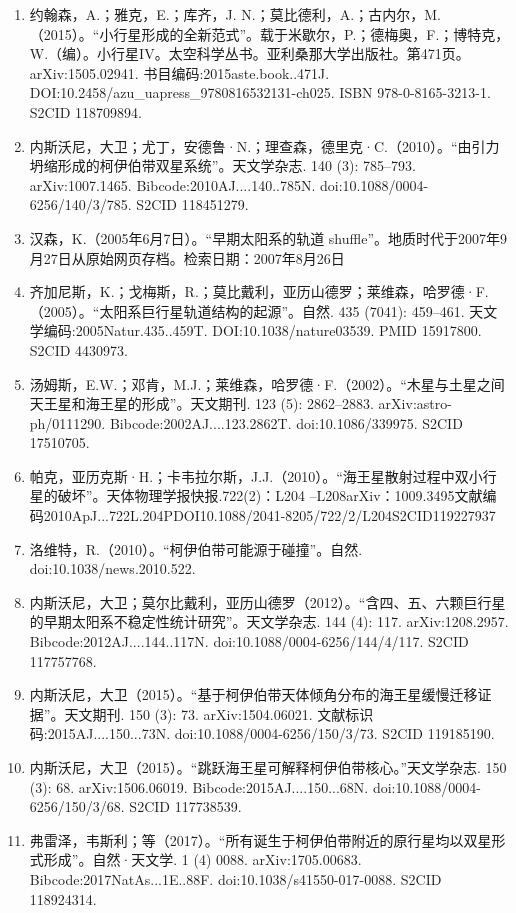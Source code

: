 \begin{enumerate}
\item 约翰森，A.；雅克，E.；库齐，J. N.；莫比德利，A.；古内尔，M.（2015）。“小行星形成的全新范式”。载于米歇尔，P.；德梅奥，F.；博特克，W.（编）。小行星IV。太空科学丛书。亚利桑那大学出版社。第471页。arXiv:1505.02941. 书目编码:2015aste.book..471J. DOI:10.2458/azu_uapress_9780816532131-ch025. ISBN 978-0-8165-3213-1. S2CID 118709894.
\item 内斯沃尼，大卫；尤丁，安德鲁·N.；理查森，德里克·C.（2010）。“由引力坍缩形成的柯伊伯带双星系统”。天文学杂志. 140 (3): 785–793. arXiv:1007.1465. Bibcode:2010AJ....140..785N. doi:10.1088/0004-6256/140/3/785. S2CID 118451279.
\item 汉森，K.（2005年6月7日）。“早期太阳系的轨道 shuffle”。地质时代于2007年9月27日从原始网页存档。检索日期：2007年8月26日
\item 齐加尼斯，K.；戈梅斯，R.；莫比戴利，亚历山德罗；莱维森，哈罗德·F.（2005）。“太阳系巨行星轨道结构的起源”。自然. 435 (7041): 459–461. 天文学编码:2005Natur.435..459T. DOI:10.1038/nature03539. PMID 15917800. S2CID 4430973.
\item 汤姆斯，E.W.；邓肯，M.J.；莱维森，哈罗德·F.（2002）。“木星与土星之间天王星和海王星的形成”。天文期刊. 123 (5): 2862–2883. arXiv:astro-ph/0111290. Bibcode:2002AJ....123.2862T. doi:10.1086/339975. S2CID 17510705.
\item 帕克，亚历克斯·H.；卡韦拉尔斯，J.J.（2010）。“海王星散射过程中双小行星的破坏”。天体物理学报快报.722(2)：L204 –L208arXiv：1009.3495文献编码2010ApJ...722L.204PDOI10.1088/2041-8205/722/2/L204S2CID119227937
\item 洛维特，R.（2010）。“柯伊伯带可能源于碰撞”。自然. doi:10.1038/news.2010.522.
\item 内斯沃尼，大卫；莫尔比戴利，亚历山德罗（2012）。“含四、五、六颗巨行星的早期太阳系不稳定性统计研究”。天文学杂志. 144 (4): 117. arXiv:1208.2957. Bibcode:2012AJ....144..117N. doi:10.1088/0004-6256/144/4/117. S2CID 117757768.
\item 内斯沃尼，大卫（2015）。“基于柯伊伯带天体倾角分布的海王星缓慢迁移证据”。天文期刊. 150 (3): 73. arXiv:1504.06021. 文献标识码:2015AJ....150...73N. doi:10.1088/0004-6256/150/3/73. S2CID 119185190.
\item 内斯沃尼，大卫（2015）。“跳跃海王星可解释柯伊伯带核心。”天文学杂志. 150 (3): 68. arXiv:1506.06019. Bibcode:2015AJ....150...68N. doi:10.1088/0004-6256/150/3/68. S2CID 117738539.
\item 弗雷泽，韦斯利；等（2017）。“所有诞生于柯伊伯带附近的原行星均以双星形式形成”。自然·天文学. 1 (4) 0088. arXiv:1705.00683. Bibcode:2017NatAs...1E..88F. doi:10.1038/s41550-017-0088. S2CID 118924314.

\end{enumerate}
